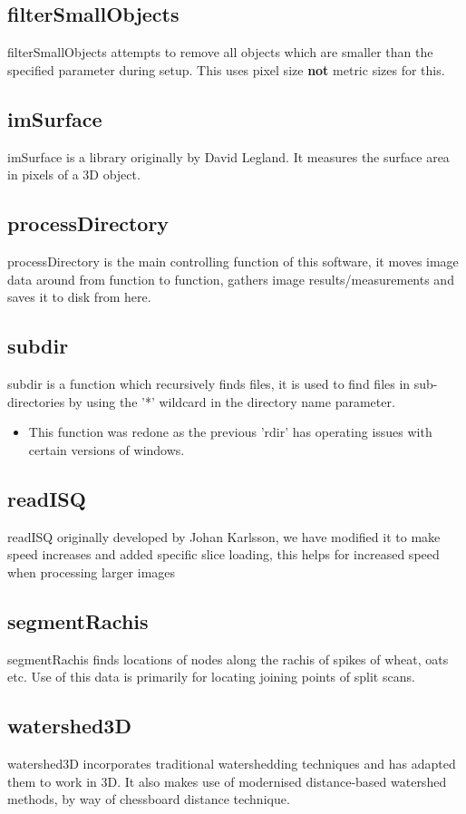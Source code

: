 \documentclass[a4paper]{article}
\begin{document}
\subsection{filterSmallObjects}
\label{sec:org5deee47}
filterSmallObjects attempts to remove all objects which are smaller than the specified parameter during setup. This uses pixel size \textbf{not} metric sizes for this.
\subsection{imSurface}
\label{sec:orge23de4f}
imSurface is a library originally by David Legland. It measures the surface area in pixels of a 3D object.
\subsection{processDirectory}
\label{sec:org4f23add}
processDirectory is the main controlling function of this software, it moves image data around from function to function, gathers image results/measurements and saves it to disk from here.
\subsection{subdir}
\label{sec:org5f168da}
subdir is a function which recursively finds files, it is used to find files in sub-directories by using the '*' wildcard in the directory name parameter.
\begin{itemize}
\item This function was redone as the previous 'rdir' has operating issues with certain versions of windows.
\end{itemize}
\subsection{readISQ}
\label{sec:orgd126516}
readISQ originally developed by Johan Karlsson, we have modified it to make speed increases and added specific slice loading, this helps for increased speed when processing larger images
\subsection{segmentRachis}
\label{sec:org5d4a95c}
segmentRachis finds locations of nodes along the rachis of spikes of wheat, oats etc. Use of this data is primarily for locating joining points of split scans.
\subsection{watershed3D}
\label{sec:org8025ac3}
watershed3D incorporates traditional watershedding techniques and has adapted them to work in 3D. It also makes use of modernised distance-based watershed methods, by way of chessboard distance technique.
\end{document}
